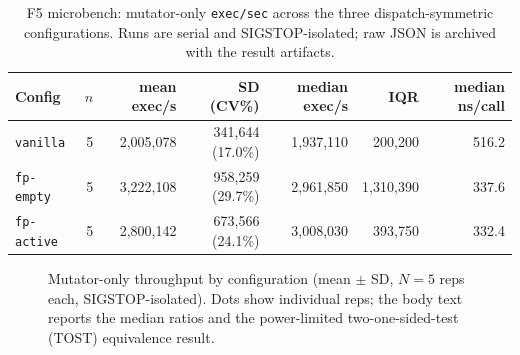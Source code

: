 \documentclass[11pt]{article}
\begin{document}
\begin{table}[t]
  \centering
  \footnotesize
  \begin{tabular}{lrrrrrr}
    \toprule
    Config & $n$ & mean exec/s & SD (CV\%) & median exec/s & IQR & median ns/call \\
    \midrule
    \texttt{vanilla}   & 5 & 2{,}005{,}078 &   341{,}644 (17.0\%) & 1{,}937{,}110 &   200{,}200 & 516.2 \\
    \texttt{fp-empty}  & 5 & 3{,}222{,}108 &   958{,}259 (29.7\%) & 2{,}961{,}850 & 1{,}310{,}390 & 337.6 \\
    \texttt{fp-active} & 5 & 2{,}800{,}142 &   673{,}566 (24.1\%) & 3{,}008{,}030 &   393{,}750 & 332.4 \\
    \bottomrule
  \end{tabular}
  \caption{F5 microbench: mutator-only \texttt{exec/sec} across the
  three dispatch-symmetric configurations. Runs are serial and
  SIGSTOP-isolated; raw JSON is archived with the result artifacts.}
  \label{tab:microbench}
\end{table}

\begin{figure}[t]
  \centering
  
  \caption{Mutator-only throughput by configuration (mean $\pm$ SD,
  $N{=}5$ reps each, SIGSTOP-isolated). Dots show individual reps;
  the body text reports the median ratios and the power-limited
  two-one-sided-test (TOST) equivalence result.}
  \label{fig:microbench}
\end{figure}
\end{document}
